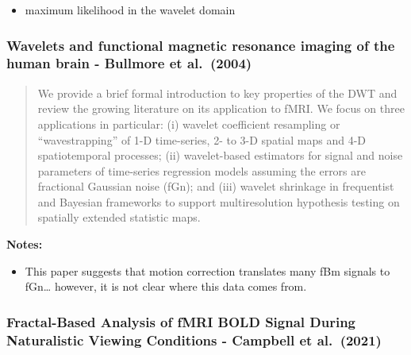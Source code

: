 \documentclass[
  sn-vancouver,
  Numbered,
  referee,
  lineno]{sn-jnl}
\providecommand{\tightlist}{%
  \setlength{\itemsep}{0pt}\setlength{\parskip}{0pt}}\usepackage{longtable,booktabs,array}
\begin{document}
\begin{itemize}
\tightlist
\item
  maximum likelihood in the wavelet domain
\end{itemize}

\subsubsection{\texorpdfstring{Wavelets and functional magnetic
resonance imaging of the human brain - Bullmore et al.~(2004)
\citep{bullmoreWaveletsFunctionalMagnetic2004}}{Wavelets and functional magnetic resonance imaging of the human brain - Bullmore et al.~(2004) {[}@bullmoreWaveletsFunctionalMagnetic2004{]}}}\label{wavelets-and-functional-magnetic-resonance-imaging-of-the-human-brain---bullmore-et-al.-2004-bullmorewaveletsfunctionalmagnetic2004-2}

\begin{quote}
We provide a brief formal introduction to key properties of the DWT and
review the growing literature on its application to fMRI. We focus on
three applications in particular: (i) wavelet coefficient resampling or
``wavestrapping'' of 1-D time-series, 2- to 3-D spatial maps and 4-D
spatiotemporal processes; (ii) wavelet-based estimators for signal and
noise parameters of time-series regression models assuming the errors
are fractional Gaussian noise (fGn); and (iii) wavelet shrinkage in
frequentist and Bayesian frameworks to support multiresolution
hypothesis testing on spatially extended statistic maps.
\end{quote}

\textbf{Notes:}

\begin{itemize}
\tightlist
\item
  This paper suggests that motion correction translates many fBm signals
  to fGn\ldots{} however, it is not clear where this data comes from.
\end{itemize}

\subsubsection{\texorpdfstring{Fractal-Based Analysis of fMRI BOLD
Signal During Naturalistic Viewing Conditions - Campbell et al.~(2021)
\citep{campbellFractalBasedAnalysisFMRI2022}}{Fractal-Based Analysis of fMRI BOLD Signal During Naturalistic Viewing Conditions - Campbell et al.~(2021) {[}@campbellFractalBasedAnalysisFMRI2022{]}}}\label{fractal-based-analysis-of-fmri-bold-signal-during-naturalistic-viewing-conditions---campbell-et-al.-2021-campbellfractalbasedanalysisfmri2022-2}
\end{document}
